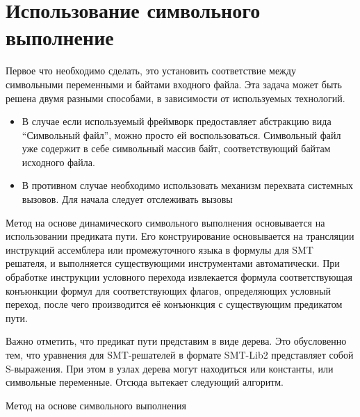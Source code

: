 




\section{Использование символьного выполнение}

Первое что необходимо сделать, это установить соответствие между символьными переменными и байтами входного файла. Эта задача может быть решена двумя разными способами, в зависимости от используемых технологий.

\begin{itemize}
    \item В случае если используемый фреймворк предоставляет абстракцию вида ``Символьный файл'', можно просто ей воспользоваться. Символьный файл уже содержит в себе символьный массив байт, соответствующий байтам исходного файла.
    \item В противном случае необходимо использовать механизм перехвата системных вызовов. Для начала следует отслеживать вызовы 
\end{itemize}


Метод на основе динамического символьного выполнения основывается на использовании предиката пути.
Его конструирование основывается на трансляции инструкций ассемблера или промежуточного языка в формулы для SMT решателя, и выполняется существующими инструментами автоматически.
При обработке инструкции условного перехода извлекается формула соответствующая конъюнкции формул для соответствующих флагов, определяющих условный переход, после чего производится её конъюнкция с существующим предикатом пути.

Важно отметить, что предикат пути представим в виде дерева. Это обусловенно тем, что уравнения для SMT-решателей в формате SMT-Lib2 представляет собой S-выражения. При этом в узлах дерева могут находиться или константы, или символьные переменные. Отсюда вытекает следующий алгоритм.

\begin{algorithm}[H]
\SetAlgoLined
{}
  \caption{Метод на основе символьного выполнения}
\end{algorithm}

